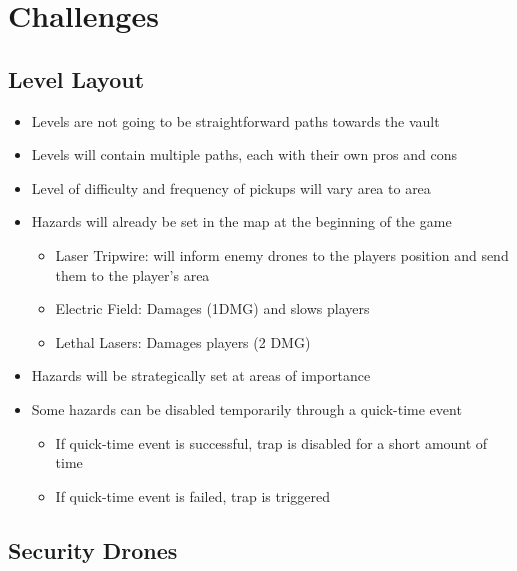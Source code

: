 \documentclass[10pt]{report}
\begin{document}
\section{Challenges}    

\subsection{Level Layout}

\begin{itemize}
    \item Levels are not going to be straightforward paths towards the vault
    \item Levels will contain multiple paths, each with their own pros and cons
    \item Level of difficulty and frequency of pickups will vary area to area
    \item Hazards will already be set in the map at the beginning of the game
    \begin{itemize}
        \item Laser Tripwire: will inform enemy drones to the players position and send them to the player's area
        \item Electric Field: Damages (1DMG) and slows players
        \item Lethal Lasers: Damages players (2 DMG)
    \end{itemize}
    \item Hazards will be strategically set at areas of importance
    \item Some hazards can be disabled temporarily through a quick-time event
    \begin{itemize}
        \item If quick-time event is successful, trap is disabled for a short amount of time
        \item If quick-time event is failed, trap is triggered
    \end{itemize}
\end{itemize}

\subsection{Security Drones}
\end{document}
